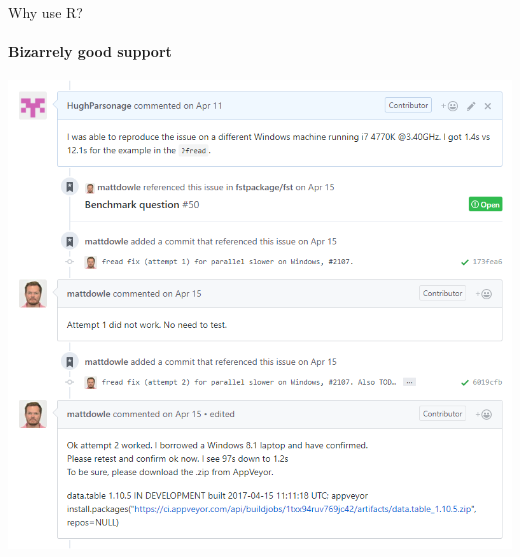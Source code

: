 \documentclass{grattan_pres}\usepackage[]{graphicx}\usepackage[]{color}
\begin{document}
\begin{frame}{Why use R?}
\framesubtitle{Bizarrely good support}
\includegraphics[height=\textheight]{Dowle-support}
\end{frame}
\end{document}
